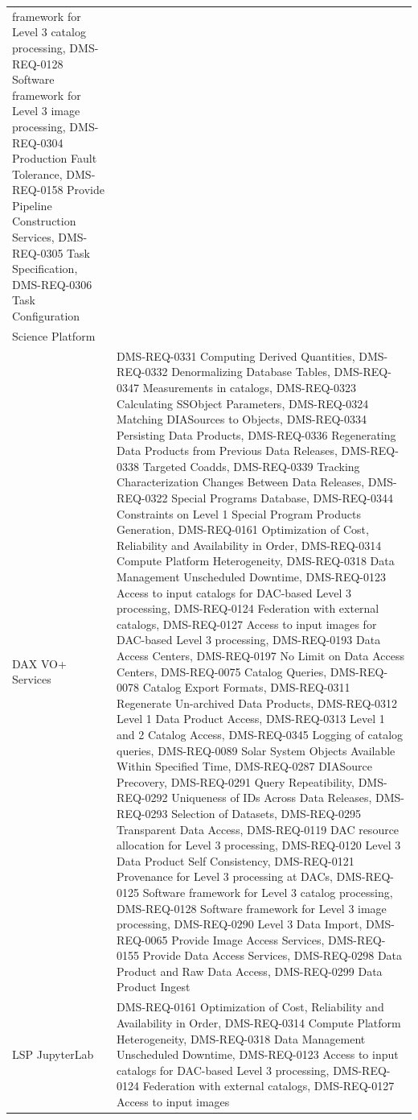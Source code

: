 \documentclass[DM,lsstdraft,toc]{lsstdoc}
\begin{document}
\begin{longtable}[]{@{}ll@{}}
framework for Level 3 catalog processing, DMS-REQ-0128 Software
framework for Level 3 image processing, DMS-REQ-0304 Production Fault
Tolerance, DMS-REQ-0158 Provide Pipeline Construction Services,
DMS-REQ-0305 Task Specification, DMS-REQ-0306 Task
Configuration\tabularnewline
Science Platform &\tabularnewline
DAX VO+ Services & DMS-REQ-0331 Computing Derived Quantities,
DMS-REQ-0332 Denormalizing Database Tables, DMS-REQ-0347 Measurements in
catalogs, DMS-REQ-0323 Calculating SSObject Parameters, DMS-REQ-0324
Matching DIASources to Objects, DMS-REQ-0334 Persisting Data Products,
DMS-REQ-0336 Regenerating Data Products from Previous Data Releases,
DMS-REQ-0338 Targeted Coadds, DMS-REQ-0339 Tracking Characterization
Changes Between Data Releases, DMS-REQ-0322 Special Programs Database,
DMS-REQ-0344 Constraints on Level 1 Special Program Products Generation,
DMS-REQ-0161 Optimization of Cost, Reliability and Availability in
Order, DMS-REQ-0314 Compute Platform Heterogeneity, DMS-REQ-0318 Data
Management Unscheduled Downtime, DMS-REQ-0123 Access to input catalogs
for DAC-based Level 3 processing, DMS-REQ-0124 Federation with external
catalogs, DMS-REQ-0127 Access to input images for DAC-based Level 3
processing, DMS-REQ-0193 Data Access Centers, DMS-REQ-0197 No Limit on
Data Access Centers, DMS-REQ-0075 Catalog Queries, DMS-REQ-0078 Catalog
Export Formats, DMS-REQ-0311 Regenerate Un-archived Data Products,
DMS-REQ-0312 Level 1 Data Product Access, DMS-REQ-0313 Level 1 and 2
Catalog Access, DMS-REQ-0345 Logging of catalog queries, DMS-REQ-0089
Solar System Objects Available Within Specified Time, DMS-REQ-0287
DIASource Precovery, DMS-REQ-0291 Query Repeatibility, DMS-REQ-0292
Uniqueness of IDs Across Data Releases, DMS-REQ-0293 Selection of
Datasets, DMS-REQ-0295 Transparent Data Access, DMS-REQ-0119 DAC
resource allocation for Level 3 processing, DMS-REQ-0120 Level 3 Data
Product Self Consistency, DMS-REQ-0121 Provenance for Level 3 processing
at DACs, DMS-REQ-0125 Software framework for Level 3 catalog processing,
DMS-REQ-0128 Software framework for Level 3 image processing,
DMS-REQ-0290 Level 3 Data Import, DMS-REQ-0065 Provide Image Access
Services, DMS-REQ-0155 Provide Data Access Services, DMS-REQ-0298 Data
Product and Raw Data Access, DMS-REQ-0299 Data Product
Ingest\tabularnewline
LSP JupyterLab & DMS-REQ-0161 Optimization of Cost, Reliability and
Availability in Order, DMS-REQ-0314 Compute Platform Heterogeneity,
DMS-REQ-0318 Data Management Unscheduled Downtime, DMS-REQ-0123 Access
to input catalogs for DAC-based Level 3 processing, DMS-REQ-0124
Federation with external catalogs, DMS-REQ-0127 Access to input images

\end{longtable}
\end{document}
